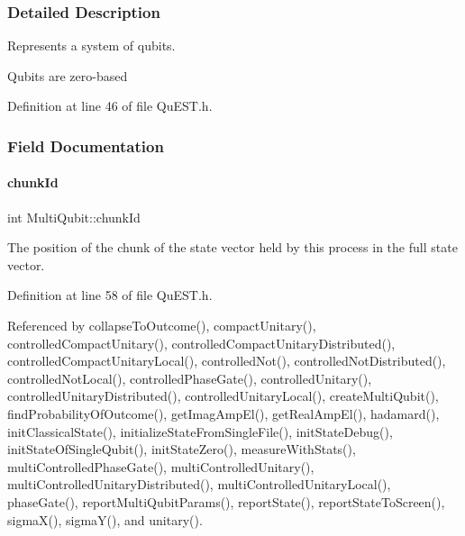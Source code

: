 \subsubsection{Detailed Description}
Represents a system of qubits. 

Qubits are zero-\/based 

Definition at line 46 of file Qu\+E\+S\+T.\+h.



\subsubsection{Field Documentation}
\mbox{\label{structMultiQubit_ab10c88249fa3825d6227ceec01d37e37}} 
\paragraph{\texorpdfstring{chunk\+Id}{chunkId}}
{\footnotesize\ttfamily int Multi\+Qubit\+::chunk\+Id}



The position of the chunk of the state vector held by this process in the full state vector. 



Definition at line 58 of file Qu\+E\+S\+T.\+h.



Referenced by collapse\+To\+Outcome(), compact\+Unitary(), controlled\+Compact\+Unitary(), controlled\+Compact\+Unitary\+Distributed(), controlled\+Compact\+Unitary\+Local(), controlled\+Not(), controlled\+Not\+Distributed(), controlled\+Not\+Local(), controlled\+Phase\+Gate(), controlled\+Unitary(), controlled\+Unitary\+Distributed(), controlled\+Unitary\+Local(), create\+Multi\+Qubit(), find\+Probability\+Of\+Outcome(), get\+Imag\+Amp\+El(), get\+Real\+Amp\+El(), hadamard(), init\+Classical\+State(), initialize\+State\+From\+Single\+File(), init\+State\+Debug(), init\+State\+Of\+Single\+Qubit(), init\+State\+Zero(), measure\+With\+Stats(), multi\+Controlled\+Phase\+Gate(), multi\+Controlled\+Unitary(), multi\+Controlled\+Unitary\+Distributed(), multi\+Controlled\+Unitary\+Local(), phase\+Gate(), report\+Multi\+Qubit\+Params(), report\+State(), report\+State\+To\+Screen(), sigma\+X(), sigma\+Y(), and unitary().

\mbox{\label{structMultiQubit_ae16f47d8b725c914fb7f66b6498d79db}} 
